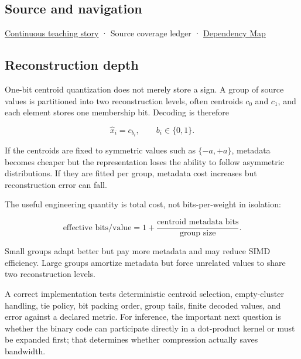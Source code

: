 \subsection{Source and navigation}\label{appendix-4ccd7a775813-source-and-navigation}

\hyperref[01-foundations-i-ch001-choosing-what-information-to-keep]{Continuous teaching story} · {Source coverage ledger} · \hyperref[appendix-4ad47bdd269a]{Dependency Map}

\subsection{Reconstruction depth}\label{appendix-4ccd7a775813-reconstruction-depth}

One-bit centroid quantization does not merely store a sign. A group of source values is partitioned into two reconstruction levels, often centroids \(c_0\) and \(c_1\), and each element stores one membership bit. Decoding is therefore

\[
\hat x_i = c_{b_i},
\qquad b_i\in\{0,1\}.
\]

If the centroids are fixed to symmetric values such as \(\{-a,+a\}\), metadata becomes cheaper but the representation loses the ability to follow asymmetric distributions. If they are fitted per group, metadata cost increases but reconstruction error can fall.

The useful engineering quantity is total cost, not bits-per-weight in isolation:

\[
\text{effective bits/value}
=
1 + \frac{\text{centroid metadata bits}}{\text{group size}}.
\]

Small groups adapt better but pay more metadata and may reduce SIMD efficiency. Large groups amortize metadata but force unrelated values to share two reconstruction levels.

A correct implementation tests deterministic centroid selection, empty-cluster handling, tie policy, bit packing order, group tails, finite decoded values, and error against a declared metric. For inference, the important next question is whether the binary code can participate directly in a dot-product kernel or must be expanded first; that determines whether compression actually saves bandwidth.
